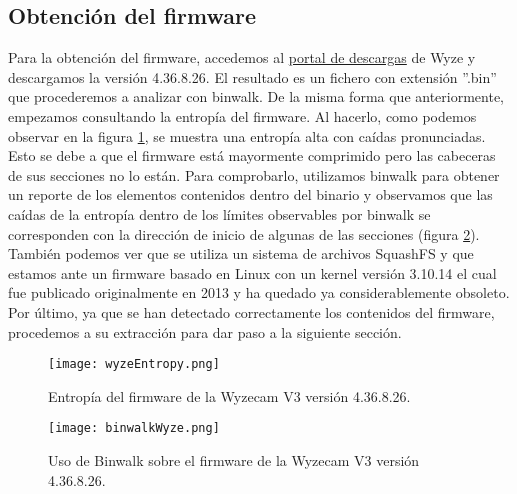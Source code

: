 \subsection{Obtención del firmware}
Para la obtención del firmware, accedemos al \href{https://support.wyze.com/hc/en-us/articles/360024852172-Release-Notes-Firmware}{portal de descargas}
de Wyze y descargamos la versión 4.36.8.26. El resultado es un fichero
con extensión ''.bin'' que procederemos a analizar con binwalk\cite{binwalk}. De la misma forma que anteriormente, empezamos consultando 
la entropía del firmware. Al hacerlo, como podemos observar en la figura \ref{fig:wyzeEntropy}, se muestra una entropía alta con caídas 
pronunciadas. Esto se debe a que el firmware está mayormente comprimido pero las cabeceras de sus secciones no lo están. Para comprobarlo,
utilizamos binwalk para obtener un reporte de los elementos contenidos dentro del binario y observamos que las caídas de 
la entropía dentro de los límites observables por binwalk se corresponden con la dirección de inicio de algunas de las secciones 
(figura \ref{fig:binwalkWyze}). También podemos ver que se utiliza un sistema de archivos SquashFS y que estamos ante un firmware basado
en Linux con un kernel versión 3.10.14 el cual fue publicado originalmente en 2013 y ha quedado ya considerablemente obsoleto. Por último, ya que se 
han detectado correctamente los contenidos del firmware, procedemos a su extracción para dar paso a la siguiente sección.

\begin{figure}[H]
    \centering
    \texttt{[image: wyzeEntropy.png]}
    \caption{Entropía del firmware de la Wyzecam V3 versión 4.36.8.26.}
    \label{fig:wyzeEntropy}
\end{figure}

\begin{figure}[H]
    \centering
    \texttt{[image: binwalkWyze.png]}
    \caption{Uso de Binwalk sobre el firmware de la Wyzecam V3 versión 4.36.8.26.}
    \label{fig:binwalkWyze}
\end{figure}

